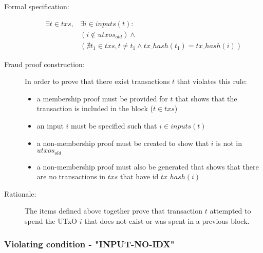 \documentclass[../main.tex]{subfiles}
\begin{document}
\begin{description}

\item[Formal specification:]
\begin{equation*}
\begin{split}
    \exists t \in txs, &\exists i \in inputs(t): \\
    &( i \notin utxos_{old} ) \land  \\
    &( \nexists t_1 \in txs, t \neq t_1 \land tx\_hash(t_1) = tx\_hash(i) )
\end{split}
\end{equation*}

\item[Fraud proof construction:] In order to prove that there exist transactions $t$ that violates this rule:
\begin{itemize}
    \item a membership proof must be provided for $t$ that shows that the transaction is included in the block ($t \in txs$)
    \item an input $i$ must be specified such that $i \in inputs(t)$
    \item a non-membership proof must be created to show that $i$ is not in $utxos_{old}$
    \item a non-membership proof must also be generated that shows that there are no transactions in $txs$ that have id $tx\_hash(i)$
\end{itemize}

\item[Rationale:] The items defined above together prove that transaction $t$ attempted to spend the UTxO $i$ that does not exist or was spent in a previous block.

\end{description}

\subsubsection{Violating condition - "INPUT-NO-IDX"}
\label{sec:INPUT-NO-IDX}
\end{document}
